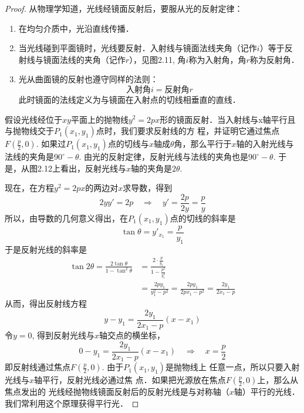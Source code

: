 \begin{proof}
从物理学知道，光线经镜面反射后，要服从光的反射定律：
\begin{enumerate}
    \item 在均匀介质中，光沿直线传播．
    \item 当光线碰到平面镜时，光线要反射．入射线与镜面法线夹角（记作$i$）等于反射线与镜面法线的夹角（记作$r$），见图2.11, 角$i$称为入射角，角$r$称为反射角．
\item 光从曲面镜的反射也遵守同样的法则：
  \[  \text{入射角}i=\text{反射角}r\]
    此时镜面的法线定义为与镜面在入射点的切线相垂直的直线．
\end{enumerate}

\begin{figure}[htp]
    \centering
    \caption{}
\end{figure}

假设光线经位于$xy$平面上的抛物线$y^2=2px$形的镜面反射．当入射线与x轴平行且与抛物线交于$P_1(x_1,y_1)$点时，我们要求反射线的方
程，并证明它通过焦点$F\left(\frac{p}{2},0\right)$. 如果过$P_1(x_1,y_1)$点的切线与$x$轴成$\theta$角，那么平行于$x$轴的入射光线与法线的夹角是$90^{\circ}-\theta$. 由光的反射定律，反射光线与法线的夹角也是$90^{\circ}-\theta$. 于是，从图2.12上看出，反射光线与$x$轴的夹角是$2\theta$.

现在，在方程$y^2=2px$的两边对$x$求导数，得到
\[2yy'=2p\quad \Rightarrow\quad y'=\frac{2p}{2y}=\frac{p}{y}\]
所以，由导数的几何意义得出，在$P_1(x_1,y_1)$点的切线的斜率是
\[\tan\theta=y'_{x_1}=\frac{p}{y_1}\]
于是反射光线的斜率是
\begin{align*}
    \tan2\theta=\frac{2\tan\theta}{1-\tan^2\theta}&=\frac{2\cdot \frac{p}{y_1}}{1-\frac{p^2}{y^2_1}}\\
    &=\frac{2py_1}{y^2_1-p^2}=\frac{2py_1}{2px_1-p^2}=\frac{2y_1}{2x_1-p}
\end{align*}
从而，得出反射线方程
\[y-y_1=\frac{2y_1}{2x_1-p}(x-x_1) \]
令$y=0$, 得到反射光线与$x$轴交点的横坐标，
\[0-y_1=\frac{2y_1}{2x_1-p}(x-x_1)\quad \Rightarrow\quad x=\frac{p}{2}\]
即反射线通过焦点$F\left(\frac{p}{2},0\right)$. 由于$P_1(x_1,y_1)$是抛物线上
任意一点，所以只要入射光线与$x$轴平行，反射光线必通过焦
点．如果把光源放在焦点$F\left(\frac{p}{2},0\right)$上，那么从焦点发出的
光线经抛物线镜面反射后的反射光线是与对称轴（$x$轴）平行的光线．我们常利用这个原理获得平行光．
\end{proof}

